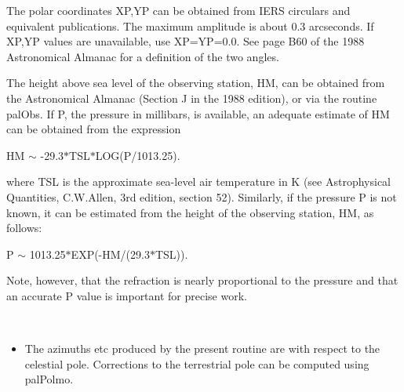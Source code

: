 \documentclass[twoside,11pt]{article}
\renewcommand{\_}{\texttt{\symbol{95}}}
\newcommand{\sstitemlist}[1]{
  \mbox{} \\
  \vspace{-3.5ex}
  \begin{itemize}
     #1
  \end{itemize}
}
\newcommand{\sstitem}{\item}
\newcommand{\sstitemlist}[1]{
      \begin{itemize}
         #1
      \end{itemize}
      \\
   }
\newcommand{\sstitem}{\item}
\begin{document}
{{{         \sstitem
         The polar coordinates XP,YP can be obtained from IERS
           circulars and equivalent publications.  The maximum amplitude
           is about 0.3 arcseconds.  If XP,YP values are unavailable,
           use XP=YP=0.0.  See page B60 of the 1988 Astronomical Almanac
           for a definition of the two angles.

         \sstitem
         The height above sea level of the observing station, HM,
           can be obtained from the Astronomical Almanac (Section J
           in the 1988 edition), or via the routine palObs.  If P,
           the pressure in millibars, is available, an adequate
           estimate of HM can be obtained from the expression

      }
              HM $\sim$ -29.3$*$TSL$*$LOG(P/1013.25).

        where TSL is the approximate sea-level air temperature in K
        (see Astrophysical Quantities, C.W.Allen, 3rd edition,
        section 52).  Similarly, if the pressure P is not known,
        it can be estimated from the height of the observing
        station, HM, as follows:

              P $\sim$ 1013.25$*$EXP(-HM/(29.3$*$TSL)).

        Note, however, that the refraction is nearly proportional to the
        pressure and that an accurate P value is important for precise
        work.

      \sstitemlist{

         \sstitem
         The azimuths etc produced by the present routine are with
           respect to the celestial pole.  Corrections to the terrestrial
           pole can be computed using palPolmo.
      }
   }
}
\end{document}
